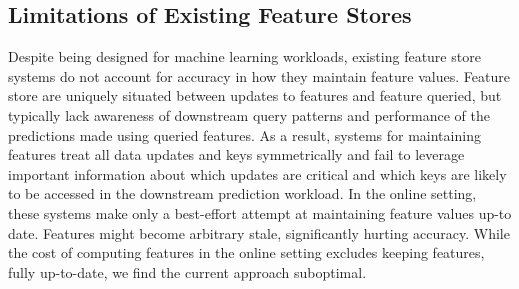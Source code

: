 \subsection{Limitations of Existing Feature Stores}
Despite being designed for machine learning workloads, existing feature store systems do not account for accuracy in how they maintain feature values. Feature store are uniquely situated between updates to features and feature queried, but typically lack awareness of downstream query patterns and performance of the predictions made using queried features. As a result, systems for maintaining features treat all data updates and keys symmetrically and fail to leverage important information about which updates are critical and which keys are likely to be accessed in the downstream prediction workload. In the online setting, these systems make only a best-effort attempt at maintaining feature values up-to date. Features might become arbitrary stale, significantly hurting accuracy. While the cost of computing features in the online setting excludes keeping features, fully up-to-date, we find the current approach suboptimal. 






